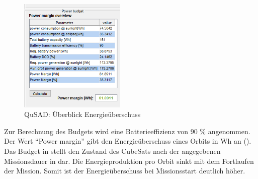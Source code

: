 			
			\begin{figure}[H]
				\centering
					\includegraphics[width=0.45\textwidth]{graphics/power6.png}
				\caption{QuSAD: Überblick Energieüberschuss}
				\label{fig:power6}
			\end{figure}
Zur Berechnung des Budgets wird eine Batterieeffizienz von \num{90} \% angenommen. Der Wert “Power margin” gibt den Energieüberschuss eines Orbits in Wh an (). Das Budget in  stellt den Zustand des CubeSats nach der angegebenen Missionsdauer in  dar. Die Energieproduktion pro Orbit sinkt mit dem Fortlaufen der  Mission. Somit ist der Energieüberschuss bei Missionsstart deutlich höher. 			
			
			
			
